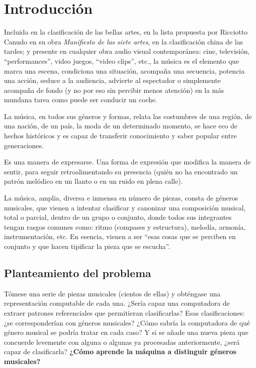 
\cleardoublepage

\chapter{Introducción}

Incluida en la clasificación de las bellas artes, en la lista propuesta por Ricciotto Canudo en su obra \emph{Manifiesto de las siete artes}, en la clasificación china de las tardes; y presente en cualquier obra audio visual contemporánea: cine, televisión, ``performances'', video juegos, ``video clips'', etc., la música es el elemento que marca una escena, condiciona una situación, acompaña una secuencia, potencia una acción, seduce a la audiencia, advierte al espectador o simplemente acompaña de fondo (y no por eso sin percibir menos atención) en la más mundana tarea como puede ser conducir un coche.

La música, en todos sus géneros y formas, relata las costumbres de una región, de una nación, de un país, la moda de un determinado momento, se hace eco de hechos históricos y es capaz de transferir conocimiento y saber popular entre generaciones.

Es una manera de expresarse. Una forma de expresión que modifica la manera de sentir, para seguir retroalimentando su presencia (quién no ha encontrado un patrón melódico en un llanto o en un ruido en plena calle).

La música, amplia, diversa e inmensa en número de piezas, consta de géneros musicales, que vienen a intentar clasificar y canonizar una composición musical, total o parcial, dentro de un grupo o conjunto, donde todos sus integrantes tengan rasgos comunes como: ritmo (compases y estructura), melodía, armonía, instrumentación, etc. En esencia, vienen a ser ``esas cosas que se perciben en conjunto y que hacen tipificar la pieza que se escucha''.

\section{Planteamiento del problema}

Tómese una serie de piezas musicales (cientos de ellas) y obténgase una representación computable de cada una. ¿Sería capaz una computadora de extraer patrones referenciales que permitieran clasificarlas? Esas clasificaciones: ¿se corresponderían con géneros musicales? ¿Cómo sabría la computadora de qué género musical se podría tratar en cada caso? Y si se añade una nueva pieza que concuerde levemente con alguna o algunas ya procesadas anteriormente, ¿será capaz de clasificarla? \textbf{¿Cómo aprende la máquina a distinguir géneros musicales?}

